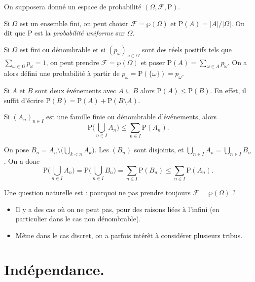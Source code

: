 \documentclass[./main]{subfiles}
\begin{document}
  On supposera donné un espace de probabilité $(\Omega, \mathcal{F}, \mathrm{P})$.

  \begin{exm}
    Si $\Omega$ est un ensemble fini, on peut choisir  $\mathcal{F} = \wp(\Omega)$ et $\mathrm{P}(A) = |A| / |\Omega|$.
    On dit que $\mathrm{P}$ est la \textit{probabilité uniforme} sur $\Omega$.
  \end{exm}

  \begin{exm}
    Si $\Omega$ est fini ou dénombrable et si $(p_\omega)_{\omega \in \Omega}$ sont des réels positifs tels que $\sum_{\omega \in \Omega} p_\omega = 1$, on peut prendre $\mathcal{F} = \wp(\Omega)$ et poser $\mathrm{P}(A) = \sum_{\omega \in A} p_\omega$.
    On a alors défini une probabilité à partir de $p_\omega = \mathrm{P}(\{\omega\}) = p_\omega$.
  \end{exm}

  Si $A$ et $B$ sont deux événements avec $A \subseteq B$ alors $\mathrm{P}(A) \le \mathrm{P}(B)$.
  En effet, il suffit d'écrire $\mathrm{P}(B) = \mathrm{P}(A) + \mathrm{P}(B \setminus A)$.

  \begin{lem}
    Si $(A_n)_{n \in I}$ est une famille finie ou dénombrable d'événements, alors \[
    \mathrm{P}\Big( \bigcup_{n \in I} A_n \Big) \le \sum_{n \in I} \mathrm{P}(A_n)
    .\]
  \end{lem}
  \begin{prv}
    On pose $B_n = A_n \setminus \big( \bigcup_{k < n} A_k\big)$. Les $(B_n)$ sont disjoints, et  $\bigcup_{n \in I} A_n = \bigcup_{n \in I} B_n$.
    On a donc \[
    \mathrm{P}\Big( \bigcup_{n \in I} A_n\Big) =
    \mathrm{P}\Big( \bigcup_{n \in I} B_n\Big)
    = \sum_{n \in I} \mathrm{P}(B_n) \le \sum_{n \in I}\mathrm{P}(A_n)
    .\]
  \end{prv}

  Une question naturelle est : pourquoi ne pas prendre toujours $\mathcal{F} = \wp(\Omega)$ ?
  \begin{itemize}
    \item Il y a des cas où on ne peut pas, pour des raisons liées à l'infini (en particulier dans le cas non dénombrable).
    \item Même dans le cas discret, on a parfois intérêt à considérer plusieurs tribus.
  \end{itemize}

  \section{Indépendance.}
\end{document}
